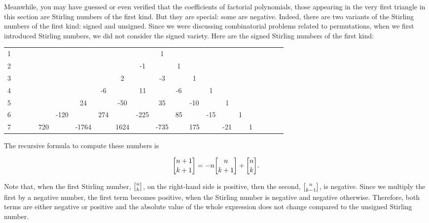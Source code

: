 \documentclass[tikz]{scrreprt}
\begin{document}

Meanwhile, you may have guessed or even verified
that the coefficients of factorial polynomials,
those appearing in the very first triangle in
this section are Stirling numbers of the first kind.
But they are special: some are negative.
Indeed, there are two variants of
the Stirling numbers of the first kind:
signed and unsigned. Since we were discussing
combinatorial problems related to permutations,
when we first introduced Stirling numbers,
we did not consider the signed variety.
Here are the signed Stirling numbers 
of the first kind:

\begin{tabular}{l c c c c c c c c c c c c c c c c c c c c}
1 &   &   &   &   &    &      &      &       &     &   1 &      &      &     &    &    &   &   &   &   &  \\
2 &   &   &   &   &    &      &      &       &  -1 &     &    1 &      &     &    &    &   &   &   &   &  \\
3 &   &   &   &   &    &      &      &     2 &     &  -3 &      &    1 &     &    &    &   &   &   &   &  \\
4 &   &   &   &   &    &      &   -6 &       &  11 &     &   -6 &      &   1 &    &    &   &   &   &   &  \\
5 &   &   &   &   &    &   24 &      &   -50 &     &  35 &      &  -10 &     &  1 &    &   &   &   &   &  \\
6 &   &   &   &   &-120&      &  274 &       &-225 &     &   85 &      & -15 &    &  1 &   &   &   &   &  \\   
7 &   &   &   &720&    & -1764&      &  1624 &     &-735 &      &  175 &     &-21 &    & 1 &   &   &   &  
\end{tabular}

The recursive formula to compute these numbers is

\begin{equation}
\stirlingOne{n+1}{k+1} = -n\stirlingOne{n}{k+1} + \stirlingOne{n}{k}.
\end{equation}

Note that, when the first Stirling number, $\stirlingOne{n}{k}$,
on the right-hand side is positive,
then the second, $\stirlingOne{n}{k-1}$, 
is negative. Since we multiply the first by a negative
number, the first term becomes positive, when the Stirling number is
negative and negative otherwise. Therefore, both terms are either
negative or positive and the absolute value of the whole expression
does not change compared
to the unsigned Stirling number.
\end{document}
